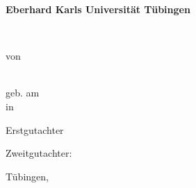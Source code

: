 \begin{titlepage}
{\centering
{\Large \textbf{Eberhard Karls Universität Tübingen}\par}
\vspace{1.75cm}
{\large \textbf{ \fak} \par}
{\large \abschluss \ \studiengang\par}
\vspace{1.75cm}
{\Large \textbf{\titel}\par}
\vspace{1.5cm}
{\large \art \par}
\vspace{3cm}
{\large  von\par}
\vspace{1.25cm}
{\autor\\[3ex]
geb. am \gebdatum\\[3ex]
in \gebort\\[3ex]
\mnr\par}}
\vfill
{\noindent Erstgutachter \betreuerI 
\par \vspace{0.25cm}
Zweitgutachter: \betreuerII
\par \vspace{0.75cm}
Tübingen, \zeitraum} %
\end{titlepage}